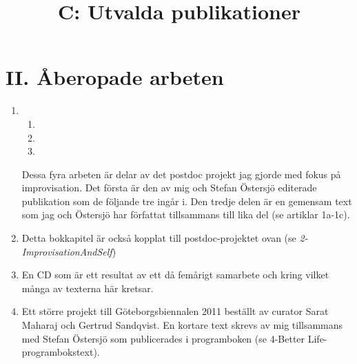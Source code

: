 \documentclass[a4paper]{article}
\title{C: Utvalda publikationer}
\date{}
\begin{document}

\thispagestyle{empty}

\section*{\textsf{II. Åberopade arbeten}}

\vspace{0.6cm}

\begin{enumerate}
\item {} %

  \begin{enumerate}
  \item {}
  \item {}
  \item {}
  \end{enumerate}

Dessa fyra arbeten är delar av det postdoc projekt jag gjorde med fokus på improvisation. Det första är den av mig och Stefan Östersjö editerade publikation som de följande tre ingår i. Den tredje delen är en gemensam text som jag och Östersjö har författat tillsammans till lika del (se artiklar 1a-1c).

\vspace{0.4cm}

\item {}

Detta bokkapitel är också kopplat till postdoc-projektet ovan (se \emph{2-ImprovisationAndSelf})

\vspace{0.4cm}

\item {}

En CD som är ett resultat av ett då femårigt samarbete och kring vilket många av texterna här kretsar.

\vspace{0.4cm}

\item {}

Ett större projekt till Göteborgsbiennalen 2011 beställt av curator Sarat Maharaj och Gertrud Sandqvist. En kortare text skrevs av mig tillsammans med Stefan Östersjö som publicerades i programboken (se 4-Better Life-programbokstext).


\end{enumerate}
\end{document}
